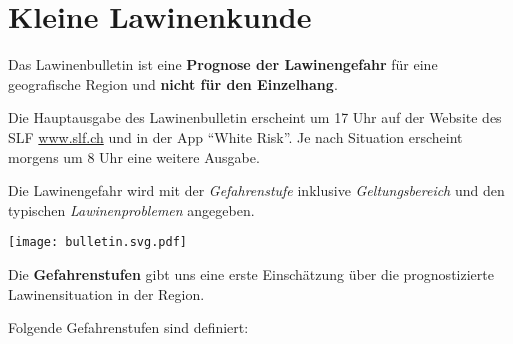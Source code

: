\section{Kleine Lawinenkunde}

Das Lawinenbulletin ist eine \textbf{Prognose der Lawinengefahr} für eine geografische Region und \textbf{nicht für den Einzelhang}.

Die Hauptausgabe des Lawinenbulletin erscheint um 17 Uhr auf der Website des SLF \href{https://www.slf.ch}{www.slf.ch} und in der App \enquote{White Risk}.
Je nach Situation erscheint morgens um 8 Uhr eine weitere Ausgabe.

Die Lawinengefahr wird mit der \textit{Gefahrenstufe} inklusive \textit{Geltungsbereich} und den typischen \textit{Lawinenproblemen} angegeben.

\begin{center}
  \texttt{[image: bulletin.svg.pdf]}
\end{center}

Die \textbf{Gefahrenstufen} gibt uns eine erste Einschätzung über die prognostizierte Lawinensituation in der Region.

\newcolumn

Folgende Gefahrenstufen sind definiert:

